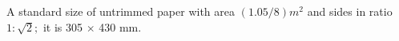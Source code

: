 A standard size of untrimmed paper with area $(1.05/8)m^{2}$  and sides in ratio
$ 1 : \sqrt{2} ; $ it is 305 \ensuremath{ \times } 430   mm.
